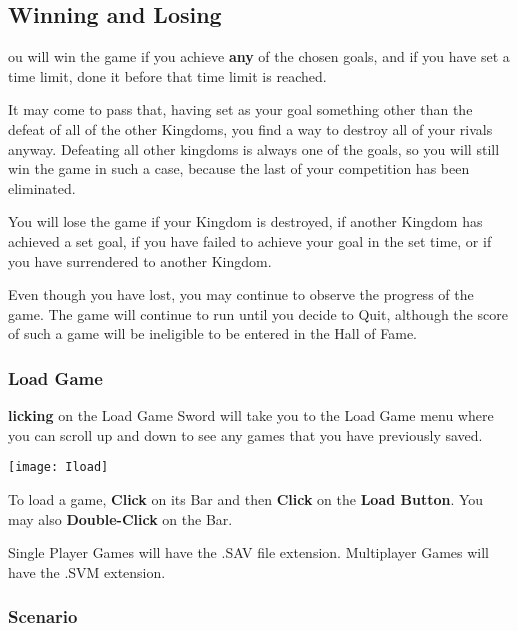 \subsection{\textsf{Winning and Losing}}


ou will win the game if you achieve \textbf{any} of the chosen goals, and if you have set a time limit, done it before that time limit is reached.

It may come to pass that, having set as your goal something other than the defeat of all of the other Kingdoms, you find a way to destroy all of your rivals anyway. Defeating all other kingdoms is always one of the goals, so you will still win the game in such a case, because the last of your competition has been eliminated.

You will lose the game if your Kingdom is destroyed, if another Kingdom has achieved a set goal, if you have failed to achieve your goal in the set time, or if you have surrendered to another Kingdom.

Even though you have lost, you may continue to observe the progress of the game. The game will continue to run until you decide to Quit, although the score of such a game will be ineligible to be entered in the Hall of Fame.

\subsubsection{\textsf{Load Game}}


\textbf{licking} on the Load Game Sword will take you to the Load Game menu where you can scroll up and down to see any games that you have previously saved.

\begin{center}
    \texttt{[image: Iload]} %
\end{center}

To load a game, \textbf{Click} on its Bar and then \textbf{Click} on the \textbf{Load Button}. You may also \textbf{Double-Click} on the Bar.

Single Player Games will have the .SAV file extension. Multiplayer Games will have the .SVM extension.

\subsubsection{\textsf{Scenario}}

